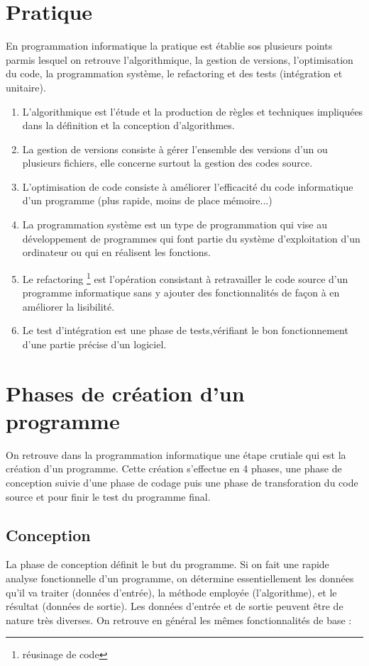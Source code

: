 \documentclass[12pt,a4paper]{article}
\begin{document}
\section{\label{pr}Pratique}
En programmation informatique la pratique est établie sos plusieurs 
points parmis lesquel on retrouve l'algorithmique, la gestion de 
versions, l'optimisation du code, la programmation système, le 
refactoring et des tests (intégration et unitaire).
 \begin{enumerate}[leftmargin=30px]
    \item L'algorithmique est l'étude et la production de règles et 
    techniques impliquées dans la définition et la conception 
    d'algorithmes.
    \item La gestion de versions consiste à gérer l'ensemble des 
    versions d'un ou plusieurs fichiers, elle concerne surtout la 
    gestion des codes source. 
    \item  L'optimisation de code consiste à améliorer l'efficacité 
    du code informatique d'un programme (plus rapide, moins de place 
    mémoire...)
    \item  La programmation système est un type de programmation qui 
    vise au développement de programmes qui font partie du système 
    d’exploitation d’un ordinateur ou qui en réalisent les fonctions.
    \item  Le refactoring \footnote{réusinage de code} est 
    l'opération consistant à retravailler le code source d'un 
    programme informatique sans y ajouter des fonctionnalités de 
    façon à en améliorer la lisibilité.
    \item  Le test d'intégration est une phase de tests,vérifiant le 
    bon fonctionnement d'une partie précise d'un logiciel.
 \end{enumerate}
\section{Phases de création d'un programme}
On retrouve dans la programmation informatique une étape crutiale qui
est la création d'un programme. Cette création s'effectue en 4 
phases, une phase de conception suivie d'une phase de codage puis une
phase de transforation du code source et pour finir le test du 
programme final.
\newpage
\subsection{Conception}
La phase de conception définit le but du programme. Si on fait une 
rapide analyse fonctionnelle d'un programme, on détermine 
essentiellement les données qu'il va traiter (données d'entrée), la 
méthode employée (l'algorithme), et le résultat (données de 
sortie). Les données d'entrée et de sortie peuvent être de 
nature très diverses. On retrouve 
en général les mêmes fonctionnalités de base :\\
\end{document}
